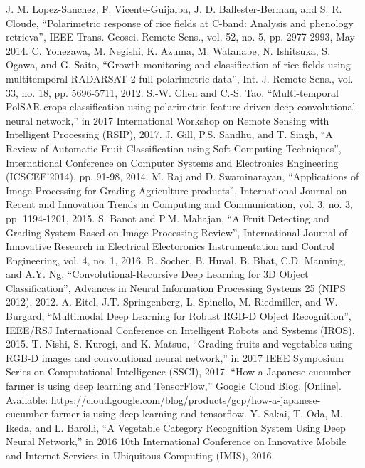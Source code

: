 \documentclass[conference]{IEEEtran}
\begin{document}
\begin{thebibliography}{00}
		 J. M. Lopez-Sanchez, F. Vicente-Guijalba, J. D. Ballester-Berman, and S. R. Cloude, ``Polarimetric response of rice fields at C-band: Analysis and phenology retrieva'', IEEE Trans. Geosci. Remote Sens., vol. 52, no. 5, pp. 2977-2993, May 2014.
		 C. Yonezawa, M. Negishi, K. Azuma, M. Watanabe, N. Ishitsuka, S. Ogawa, and G. Saito, ``Growth monitoring and classification of rice fields using multitemporal RADARSAT-2 full-polarimetric data'', Int. J. Remote Sens., vol. 33, no. 18, pp. 5696-5711, 2012.
		 S.-W. Chen and C.-S. Tao, ``Multi-temporal PolSAR crops classification using polarimetric-feature-driven deep convolutional neural network,'' in 2017 International Workshop on Remote Sensing with Intelligent Processing (RSIP), 2017.
		 J. Gill, P.S. Sandhu, and T. Singh, ``A Review of Automatic Fruit Classification using Soft Computing Techniques'', International Conference on Computer Systems and Electronics Engineering (ICSCEE'2014), pp. 91-98, 2014.
		 M. Raj and D. Swaminarayan, ``Applications of Image Processing for Grading Agriculture products'', International Journal on Recent and Innovation Trends in Computing and Communication, vol. 3, no. 3, pp. 1194-1201, 2015.
		 S. Banot and P.M. Mahajan, ``A Fruit Detecting and Grading System Based on Image Processing-Review'', International Journal of Innovative Research in Electrical Electoronics Instrumentation and Control Engineering, vol. 4, no. 1, 2016.
		 R. Socher, B. Huval, B. Bhat, C.D. Manning, and A.Y. Ng, ``Convolutional-Recursive Deep Learning for 3D Object Classification'', Advances in Neural Information Processing Systems 25 (NIPS 2012), 2012.
		 A. Eitel, J.T. Springenberg, L. Spinello, M. Riedmiller, and W. Burgard, ``Multimodal Deep Learning for Robust RGB-D Object Recognition'', IEEE/RSJ International Conference on Intelligent Robots and Systems (IROS), 2015.
		 T. Nishi, S. Kurogi, and K. Matsuo, ``Grading fruits and vegetables using RGB-D images and convolutional neural network,'' in 2017 IEEE Symposium Series on Computational Intelligence (SSCI), 2017.
		 ``How a Japanese cucumber farmer is using deep learning and TensorFlow,'' Google Cloud Blog. [Online]. Available: https://cloud.google.com/blog/products/gcp/how-a-japanese-cucumber-farmer-is-using-deep-learning-and-tensorflow.
		 Y. Sakai, T. Oda, M. Ikeda, and L. Barolli, ``A Vegetable Category Recognition System Using Deep Neural Network,'' in 2016 10th International Conference on Innovative Mobile and Internet Services in Ubiquitous Computing (IMIS), 2016.

\end{thebibliography}
\end{document}
